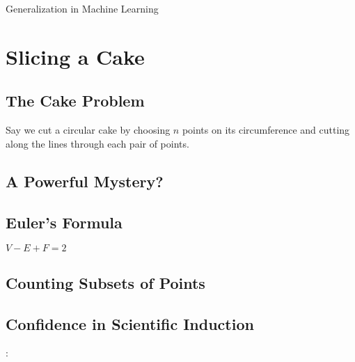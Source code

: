 \documentclass{article}
\begin{document}
    \begin{center}
        \LARGE
        Generalization in Machine Learning 
    \end{center}
    
    \setcounter{section}{-1}
    \section{Slicing a Cake}
        \subsection*{The Cake Problem}

            Say we cut a circular cake by choosing $n$ points on its
            circumference and cutting along the lines through each pair of
            points. 

        \subsection*{A Powerful Mystery?}

        \subsection*{Euler's Formula}

            $V - E + F = 2$

        \subsection*{Counting Subsets of Points}

        \subsection*{Confidence in Scientific Induction}

        :
\end{document}
